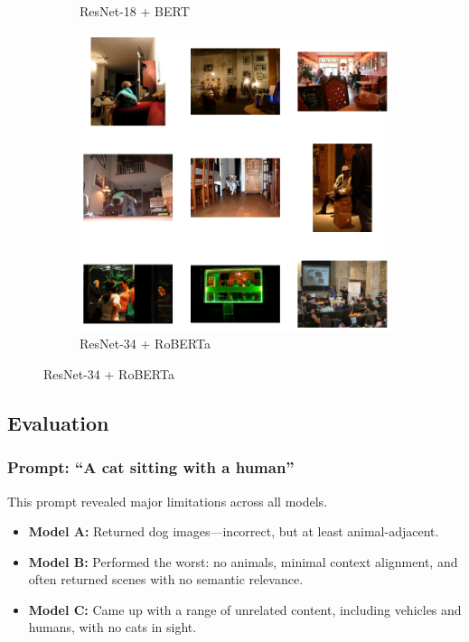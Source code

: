 \documentclass[11pt]{article}
\begin{document}
\begin{figure}[H]
\begin{subfigure}[b]{0.3\textwidth}
        \caption{\tiny ResNet-18 + BERT}
    \end{subfigure}
    \hfill
    \begin{subfigure}[b]{0.3\textwidth}
        \includegraphics[width=\linewidth]{Q2/All kinds of food on a table/3.png}
        \caption{\tiny ResNet-34 + RoBERTa}
    \end{subfigure}
    
\end{figure}

\subsection{Evaluation}

\subsubsection{Prompt: ``A cat sitting with a human''}
This prompt revealed major limitations across all models.

\begin{itemize}
    \item \textbf{Model A:} Returned dog images—incorrect, but at least animal-adjacent.
    \item \textbf{Model B:} Performed the worst: no animals, minimal context alignment, and often returned scenes with no semantic relevance.
    \item \textbf{Model C:} Came up with a range of unrelated content, including vehicles and humans, with no cats in sight.
\end{itemize}
\end{document}
